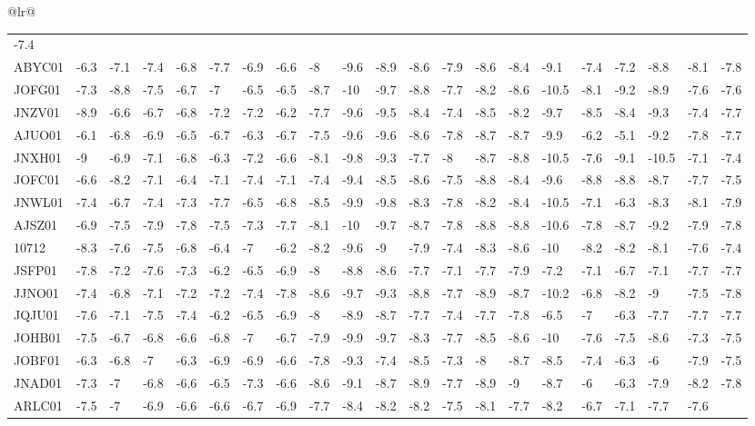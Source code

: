 \documentclass[12pt,twoside]{reedthesis}
\begin{document}
\begin{longtable}[c]{@{}lr@{}}
\begin{longtable}[]{@{}lllllllllllllllllllll@{}}
  -7.4\tabularnewline
  ABYC01 & -6.3 & -7.1 & -7.4 & -6.8 & -7.7 & -6.9 & -6.6 & -8 & -9.6 &
  -8.9 & -8.6 & -7.9 & -8.6 & -8.4 & -9.1 & -7.4 & -7.2 & -8.8 & -8.1 &
  -7.8\tabularnewline
  JOFG01 & -7.3 & -8.8 & -7.5 & -6.7 & -7 & -6.5 & -6.5 & -8.7 & -10 &
  -9.7 & -8.8 & -7.7 & -8.2 & -8.6 & -10.5 & -8.1 & -9.2 & -8.9 & -7.6 &
  -7.6\tabularnewline
  JNZV01 & -8.9 & -6.6 & -6.7 & -6.8 & -7.2 & -7.2 & -6.2 & -7.7 & -9.6 &
  -9.5 & -8.4 & -7.4 & -8.5 & -8.2 & -9.7 & -8.5 & -8.4 & -9.3 & -7.4 &
  -7.7\tabularnewline
  AJUO01 & -6.1 & -6.8 & -6.9 & -6.5 & -6.7 & -6.3 & -6.7 & -7.5 & -9.6 &
  -9.6 & -8.6 & -7.8 & -8.7 & -8.7 & -9.9 & -6.2 & -5.1 & -9.2 & -7.8 &
  -7.7\tabularnewline
  JNXH01 & -9 & -6.9 & -7.1 & -6.8 & -6.3 & -7.2 & -6.6 & -8.1 & -9.8 &
  -9.3 & -7.7 & -8 & -8.7 & -8.8 & -10.5 & -7.6 & -9.1 & -10.5 & -7.1 &
  -7.4\tabularnewline
  JOFC01 & -6.6 & -8.2 & -7.1 & -6.4 & -7.1 & -7.4 & -7.1 & -7.4 & -9.4 &
  -8.5 & -8.6 & -7.5 & -8.8 & -8.4 & -9.6 & -8.8 & -8.8 & -8.7 & -7.7 &
  -7.5\tabularnewline
  JNWL01 & -7.4 & -6.7 & -7.4 & -7.3 & -7.7 & -6.5 & -6.8 & -8.5 & -9.9 &
  -9.8 & -8.3 & -7.8 & -8.2 & -8.4 & -10.5 & -7.1 & -6.3 & -8.3 & -8.1 &
  -7.9\tabularnewline
  AJSZ01 & -6.9 & -7.5 & -7.9 & -7.8 & -7.5 & -7.3 & -7.7 & -8.1 & -10 &
  -9.7 & -8.7 & -7.8 & -8.8 & -8.8 & -10.6 & -7.8 & -8.7 & -9.2 & -7.9 &
  -7.8\tabularnewline
  10712 & -8.3 & -7.6 & -7.5 & -6.8 & -6.4 & -7 & -6.2 & -8.2 & -9.6 & -9
  & -7.9 & -7.4 & -8.3 & -8.6 & -10 & -8.2 & -8.2 & -8.1 & -7.6 &
  -7.4\tabularnewline
  JSFP01 & -7.8 & -7.2 & -7.6 & -7.3 & -6.2 & -6.5 & -6.9 & -8 & -8.8 &
  -8.6 & -7.7 & -7.1 & -7.7 & -7.9 & -7.2 & -7.1 & -6.7 & -7.1 & -7.7 &
  -7.7\tabularnewline
  JJNO01 & -7.4 & -6.8 & -7.1 & -7.2 & -7.2 & -7.4 & -7.8 & -8.6 & -9.7 &
  -9.3 & -8.8 & -7.7 & -8.9 & -8.7 & -10.2 & -6.8 & -8.2 & -9 & -7.5 &
  -7.8\tabularnewline
  JQJU01 & -7.6 & -7.1 & -7.5 & -7.4 & -6.2 & -6.5 & -6.9 & -8 & -8.9 &
  -8.7 & -7.7 & -7.4 & -7.7 & -7.8 & -6.5 & -7 & -6.3 & -7.7 & -7.7 &
  -7.7\tabularnewline
  JOHB01 & -7.5 & -6.7 & -6.8 & -6.6 & -6.8 & -7 & -6.7 & -7.9 & -9.9 &
  -9.7 & -8.3 & -7.7 & -8.5 & -8.6 & -10 & -7.6 & -7.5 & -8.6 & -7.3 &
  -7.5\tabularnewline
  JOBF01 & -6.3 & -6.8 & -7 & -6.3 & -6.9 & -6.9 & -6.6 & -7.8 & -9.3 &
  -7.4 & -8.5 & -7.3 & -8 & -8.7 & -8.5 & -7.4 & -6.3 & -6 & -7.9 &
  -7.5\tabularnewline
  JNAD01 & -7.3 & -7 & -6.8 & -6.6 & -6.5 & -7.3 & -6.6 & -8.6 & -9.1 &
  -8.7 & -8.9 & -7.7 & -8.9 & -9 & -8.7 & -6 & -6.3 & -7.9 & -8.2 &
  -7.8\tabularnewline
  ARLC01 & -7.5 & -7 & -6.9 & -6.6 & -6.6 & -6.7 & -6.9 & -7.7 & -8.4 &
  -8.2 & -8.2 & -7.5 & -8.1 & -7.7 & -8.2 & -6.7 & -7.1 & -7.7 & -7.6 &

\end{longtable}
\end{longtable}
\end{document}
